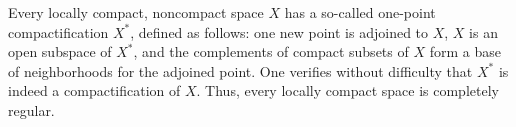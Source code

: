 Every locally compact, noncompact space $X$ has a so-called one-point compactification $X^*$, defined as follows: one new point is adjoined to $X$, $X$ is an open subspace of $X^*$, and the complements of compact subsets of $X$ form a base of neighborhoods for the adjoined point. One verifies without difficulty that $X^*$ is indeed a compactification of $X$. Thus, every locally compact space is completely regular.
